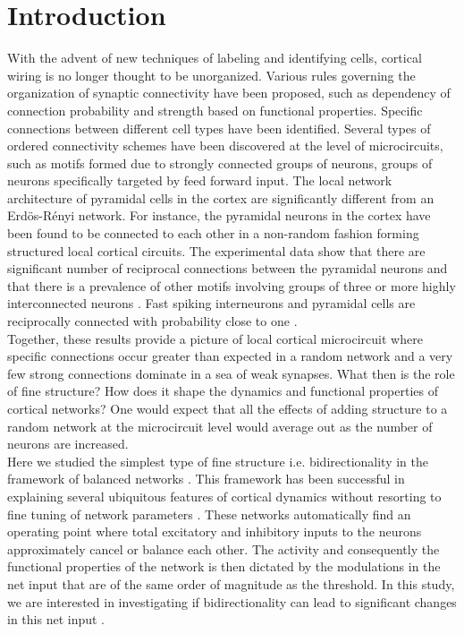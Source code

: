 \section{Introduction}
With the advent of new techniques of labeling and identifying cells, cortical wiring is no longer thought to be unorganized. Various rules governing the organization of synaptic connectivity have been proposed, such as dependency of connection probability and strength based on functional properties\cite{Ko2011, Cossell2015, Lee2016}.  Specific connections between different cell types have been identified. Several types of ordered connectivity schemes have been discovered at the level of microcircuits, such as motifs formed due to strongly connected groups of neurons, groups of neurons specifically targeted by feed forward input. The local network architecture of pyramidal cells in the cortex are significantly different from an Erdös-Rényi network. For instance, the pyramidal neurons in the cortex have been found to be connected to each other in a non-random fashion forming structured local cortical circuits. The experimental data show that there are significant number of reciprocal connections between the pyramidal neurons and that there is a prevalence of other motifs involving groups of three or more highly interconnected neurons \cite{markram1997,thomson2002, Song2005, Perin2011}. Fast spiking interneurons and pyramidal cells are reciprocally connected with probability close to one \cite{Yoshimura2005}.\\
Together, these results provide a picture of local cortical microcircuit where specific connections occur greater than expected in a random network and a very few strong connections dominate in a sea of weak synapses. What then is the role of fine structure? How does it shape the dynamics and functional properties of cortical networks? One would expect that all the effects of adding structure to a random network at the microcircuit level would average out as the number of neurons are increased.  \\

Here we studied the simplest type of fine structure i.e. bidirectionality in the framework of balanced networks \cite{carl1996, carl1998, carl2004}. This framework has been successful in explaining several ubiquitous features of cortical dynamics without resorting to fine tuning of network parameters \cite{softky1993, Holt1996, roxin2011}. These networks automatically find an operating point where total excitatory and inhibitory inputs to the neurons approximately cancel or balance each other. The activity and consequently the functional properties of the network is then dictated by the modulations in the net input that are of the same order of magnitude as the threshold. In this study, we are interested in investigating if bidirectionality can lead to significant changes in this net input . \\
	
